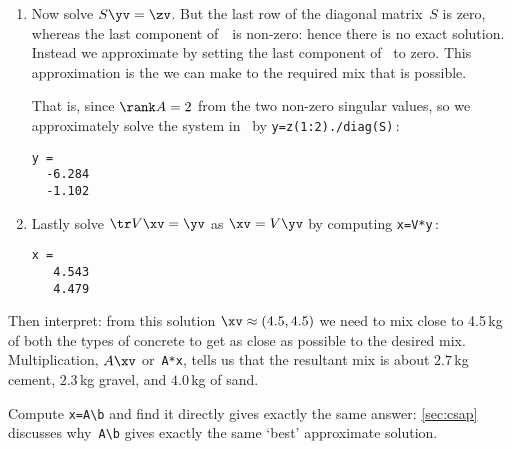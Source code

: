 \begin{example}
\begin{solution}
\begin{enumerate}
\item Now solve \(S\yv=\zv\).
But the last row of the diagonal matrix~\(S\) is zero, whereas the last component of~\zv\ is non-zero: hence there is no exact solution. 
Instead we approximate by setting the last component of \zv\ to zero.
This approximation is the \emph{} we can make to the required mix that is possible.

That is, since \(\rank A=2\) from the two non-zero singular values, so we approximately solve the system in \script\ by \verb|y=z(1:2)./diag(S)|\,:
\begin{verbatim}
y =
  -6.284
  -1.102
\end{verbatim}

\item Lastly solve \(\tr V\xv=\yv\) as \(\xv=V\yv\) by computing \verb|x=V*y|\,:
\begin{verbatim}
x =
   4.543
   4.479
\end{verbatim}
\end{enumerate}
Then interpret: from this solution \(\xv\approx(4.5,4.5)\) we need to mix close to 4.5\,kg of both the types of concrete to get as close as possible to the desired mix.
Multiplication, \(A\xv\) or~\verb|A*x|, tells us that the resultant mix is about \(2.7\)\,kg cement, \(2.3\)\,kg gravel, and \(4.0\)\,kg of sand.

Compute \verb|x=A\b| and find it directly gives exactly the same answer: \autoref{sec:csap} discusses why~\verb|A\b| gives exactly the same `best' approximate solution. 
\end{solution}
\end{example}






